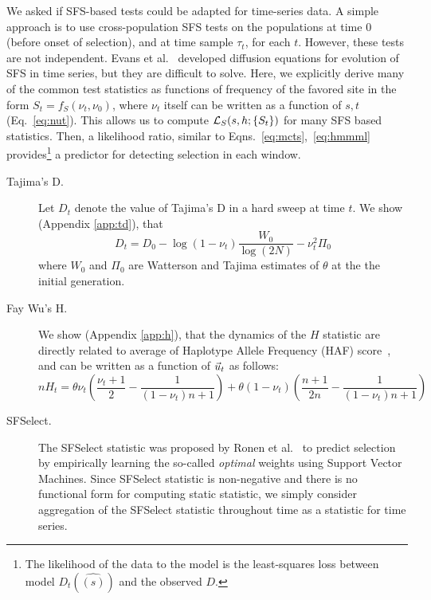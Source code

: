\documentclass[11pt]{article}
\begin{document}
We asked if SFS-based tests could be adapted for time-series data. A
simple approach is to use cross-population SFS tests on the
populations at time $0$ (before onset of selection), and at time
sample $\tau_t$, for each $t$. However, these tests are not
independent. Evans et al.~\cite{evans2007non} developed diffusion
equations for evolution of SFS in time series, but they are difficult
to solve. Here, we explicitly derive many of the common test
statistics as functions of frequency of the favored site in the form
$S_t=f_S(\nu_t,\nu_0)$, where $\nu_t$ itself can be written as a
function of $s,t$ (Eq.~\ref{eq:nut}). This allows us to compute
${\cal L}_S(s,h; \{S_t\})$ for many SFS based statistics. Then, a
likelihood ratio, similar to Eqns.~\ref{eq:mcts},~\ref{eq:hmmml}
provides\footnote{The likelihood of the data to the model is the
  least-squares loss between model $D_t(\hat{(s)})$ and the observed
  $D$.} a predictor for detecting selection in each window.
\begin{description}
\item [Tajima's D.] Let $D_t$ denote the value of Tajima's D in a hard
  sweep at time $t$. We show (Appendix \ref{app:td}), that
  \begin{equation}
    D_t=D_0-\log(1-\nu_t) \frac{W_0}{\log(2N)} -\nu_t^2 \Pi_0
    \label{eq:tdt}    
  \end{equation}
  where $W_0$ and $\Pi_0$ are Watterson and Tajima estimates of
  $\theta$ at the the initial generation.  
\item[Fay Wu's H.] We show (Appendix \ref{app:h}), that the dynamics
  of the $H$ statistic are directly related to average of Haplotype
  Allele Frequency (HAF) score~\cite{ronen2015predicting}, and can be
  written as a function of $\vec{u}_t$ as follows:
  \begin{equation}
    nH_t= \theta \nu_t \left(\frac{\nu_t+1}{2} -
      \frac{1}{(1-\nu_t)n+1}\right) + \theta
    (1-\nu_t)\left(\frac{n+1}{2n}-\frac{1}{(1-\nu_t)n+1}\right)
    \label{eq:ht}
  \end{equation}	
	
\item[SFSelect.] The SFSelect statistic
  was proposed by Ronen et al.~\cite{ronen2013learning} to predict
  selection by empirically learning the so-called \emph{optimal}
  weights using Support Vector Machines. Since SFSelect statistic is 
  non-negative and there is no functional form for computing static statistic, 
  we simply consider aggregation of the SFSelect statistic throughout time as a 
  statistic for time series.
\end{description}
\end{document}
